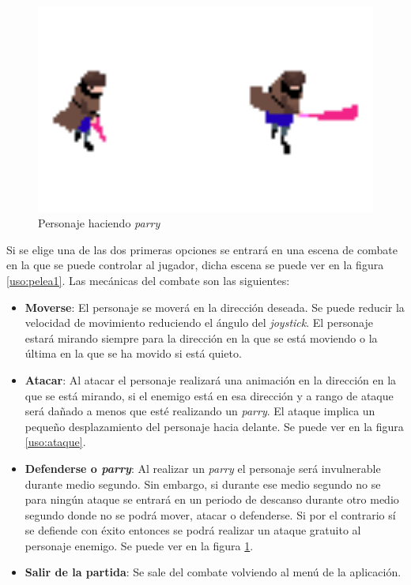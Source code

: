 \begin{figure}[h]
	\centerline{\includegraphics[width=14cm]{otros/manual/parry.png}}
	\caption{Personaje haciendo \textit{parry}}
	\label{uso:parry}
\end{figure}


Si se elige una de las dos primeras opciones se entrará en una escena de combate en la que se puede controlar al jugador, dicha escena se puede ver en la figura \ref{uso:pelea1}. Las mecánicas del combate son las siguientes:

\begin{itemize}
	\item \textbf{Moverse}: El personaje se moverá en la dirección deseada. Se puede reducir la velocidad de movimiento reduciendo el ángulo del \textit{joystick}. El personaje estará mirando siempre para la dirección en la que se está moviendo o la última en la que se ha movido si está quieto.
	\item \textbf{Atacar}: Al atacar el personaje realizará una animación en la dirección en la que se está mirando, si el enemigo está en esa dirección y a rango de ataque será dañado a menos que esté realizando un \textit{parry}. El ataque implica un pequeño desplazamiento del personaje hacia delante. Se puede ver en la figura \ref{uso:ataque}.
	\item \textbf{Defenderse o \textit{parry}}: Al realizar un \textit{parry} el personaje será invulnerable durante medio segundo. Sin embargo, si durante ese medio segundo no se para ningún ataque se entrará en un periodo de descanso durante otro medio segundo donde no se podrá mover, atacar o defenderse. Si por el contrario sí se defiende con éxito entonces se podrá realizar un ataque gratuito al personaje enemigo. Se puede ver en la figura \ref{uso:parry}.
	\item \textbf{Salir de la partida}: Se sale del combate volviendo al menú de la aplicación. 
\end{itemize}


